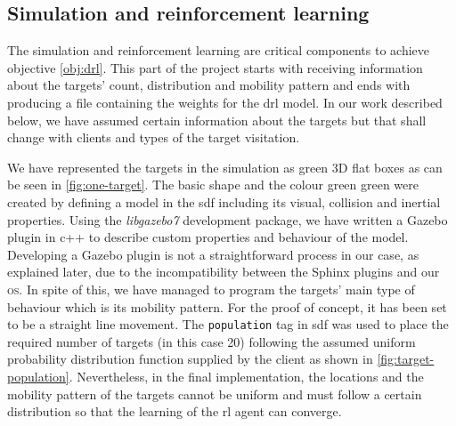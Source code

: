 \documentclass[../main.tex]{subfiles}
\begin{document}
\subsection{Simulation and reinforcement learning}





The simulation and reinforcement learning are critical
components to achieve objective \ref{obj:drl}.
This part of the project starts with receiving
information about the targets' count, distribution
and mobility pattern
and ends with producing a file containing the weights
for the \gls{drl} model.
In our work described below, we have assumed certain
information about the targets but that shall change
with clients and types of the target visitation.

We have represented the targets in the simulation
as green 3D flat boxes
as can be seen in \cref{fig:one-target}. 
The basic shape and the colour green green were created by 
defining a model 
in the \gls{sdf}
including its visual, collision and inertial properties.
Using the \textit{libgazebo7} development package, 
we have written a Gazebo plugin 
in c++ to describe custom properties and  
behaviour of the model.
Developing a Gazebo plugin is not a straightforward
process in our case, as explained later, due to 
the incompatibility between the Sphinx plugins and
our \textsc{os}.
In spite of this, we have managed to program the targets' 
main type of behaviour which is its mobility pattern.
For the proof of concept, 
it has been set to be a straight line movement.
The \texttt{population} tag in \gls{sdf} was used 
to place the required number of targets (in this case 20)
following the assumed uniform probability distribution 
function supplied by the
client as shown in \cref{fig:target-population}.
Nevertheless, in the final implementation, the locations 
and the mobility pattern of the targets cannot be uniform
and must follow a certain distribution so that the learning
of the \gls{rl} agent can converge.
\end{document}

